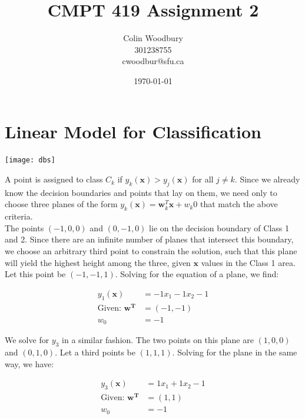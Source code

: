 \documentclass{article}
\begin{document}
\title{CMPT 419 Assignment 2}
\author{Colin Woodbury\\ 301238755\\ cwoodbur@sfu.ca}
\date{\today}
\maketitle

\tableofcontents
\clearpage

\section{Linear Model for Classification}

\begin{center}
  \texttt{[image: dbs]}
\end{center}

A point is assigned to class $C_k$ if $y_k(\mathbf{x}) > y_j(\mathbf{x})$
for all $j \neq k$. Since we already know the decision boundaries and
points that lay on them, we need only to choose three planes of the
form $y_k(\mathbf{x}) = \mathbf{w}^T_k\mathbf{x} + w_k0$ that match the
above criteria.\\

The points $(-1,0,0)$ and $(0,-1,0)$ lie on the decision boundary of
Class 1 and 2. Since there are an infinite number of planes that intersect
this boundary, we choose an arbitrary third point to constrain the solution,
such that this plane will yield the highest height among the three, given
$\mathbf{x}$ values in the Class 1 area.
Let this point be $(-1,-1,1)$. Solving for the equation of a plane,
we find:

\begin{align*}
  y_1(\mathbf{x}) &= -1x_1 - 1x_2 - 1\\
  \text{Given: } \mathbf{w^T} &= (-1,-1)\\
  w_0 &= -1
\end{align*}

We solve for $y_3$ in a similar fashion. The two points on this plane
are $(1,0,0)$ and $(0,1,0)$. Let a third points be $(1,1,1)$. Solving
for the plane in the same way, we have:

\begin{align*}
  y_3(\mathbf{x}) &= 1x_1 + 1x_2 - 1\\
  \text{Given: } \mathbf{w^T} &= (1,1)\\
  w_0 &= -1
\end{align*}
\end{document}
